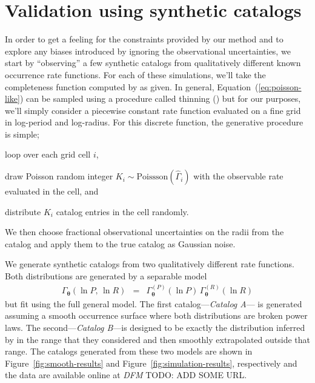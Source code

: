 \documentclass[12pt,preprint]{aastex}
\newcommand{\Fig}[1]{Figure~\ref{fig:#1}}
\newcommand{\fig}[1]{\Fig{#1}}
\newcommand{\Eq}[1]{Equation~(\ref{eq:#1})}
\newcommand{\eq}[1]{\Eq{#1}}
\newcommand{\sectlabel}[1]{\label{sect:#1}}
\newcommand{\bvec}[1]{\ensuremath{\boldsymbol{#1}}}
\newcommand{\todo}[3]{{\color{#2} \emph{#1} TODO: #3}}
\newcommand{\dfmtodo}[1]{\todo{DFM}{red}{#1}}
\newcommand{\rate}{\ensuremath{\Gamma}}
\newcommand{\ratepar}{{\ensuremath{\theta}}}
\newcommand{\ratepars}{{\ensuremath{\bvec{\ratepar}}}}
\newcommand{\obs}[1]{\ensuremath{\hat{#1}}}
\newcommand{\radius}{\ensuremath{R}}
\newcommand{\period}{\ensuremath{P}}
\newcommand{\modela}{\emph{Catalog A}}
\newcommand{\modelb}{\emph{Catalog B}}
\begin{document}
\section{Validation using synthetic catalogs}
\sectlabel{valid}

In order to get a feeling for the constraints provided by our method and to
explore any biases introduced by ignoring the observational uncertainties, we
start by ``observing'' a few synthetic catalogs from qualitatively different
known occurrence rate functions.
For each of these simulations, we'll take the completeness function computed
by \citet{petigura} as given.
In general, \eq{poisson-like} can be sampled using a procedure called thinning
(\citealt{poisson}) but for our purposes, we'll simply consider a piecewise
constant rate function evaluated on a fine grid in log-period and log-radius.
For this discrete function, the generative procedure is simple;
\begin{enumerate}
{\item loop over each grid cell $i$,}
{\item draw Poisson random integer $K_i\sim\mathrm{Poissson}(\obs{\rate}_i)$
with the observable rate evaluated in the cell, and}
{\item distribute $K_i$ catalog entries in the cell randomly.}
\end{enumerate}
We then choose fractional observational uncertainties on the radii from the
\citet{petigura} catalog and apply them to the true catalog as Gaussian noise.

We generate synthetic catalogs from two qualitatively different rate
functions.
Both distributions are generated by a separable model
\begin{eqnarray}
\rate_\ratepars (\ln\period,\,\ln\radius) &=&
    \rate_\ratepars^{(\period)}(\ln\period)\,
    \rate_\ratepars^{(\radius)}(\ln\radius)
\end{eqnarray}
but fit using the full general model.
The first catalog---\modela--- is generated assuming a smooth occurrence
surface where both distributions are broken power laws.
The second---\modelb---is designed to be exactly the distribution inferred by
\citet{petigura} in the range that they considered and then smoothly
extrapolated outside that range.
The catalogs generated from these two models are shown in \fig{smooth-results}
and \fig{simulation-results}, respectively and the data are available online
at \dfmtodo{ADD SOME URL}.
\end{document}
